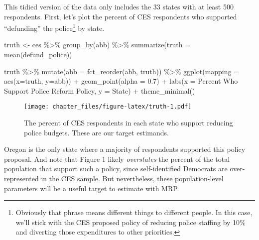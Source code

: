 \documentclass[
]{article}
\newenvironment{Shaded}{\begin{snugshade}}{\end{snugshade}}
\newcommand{\AttributeTok}[1]{\textcolor[rgb]{0.77,0.63,0.00}{#1}}
\newcommand{\FloatTok}[1]{\textcolor[rgb]{0.00,0.00,0.81}{#1}}
\newcommand{\FunctionTok}[1]{\textcolor[rgb]{0.00,0.00,0.00}{#1}}
\newcommand{\NormalTok}[1]{#1}
\newcommand{\OtherTok}[1]{\textcolor[rgb]{0.56,0.35,0.01}{#1}}
\newcommand{\SpecialCharTok}[1]{\textcolor[rgb]{0.00,0.00,0.00}{#1}}
\newcommand{\StringTok}[1]{\textcolor[rgb]{0.31,0.60,0.02}{#1}}
\begin{document}
This tidied version of the data only includes the 33 states with at
least 500 respondents. First, let's plot the percent of CES respondents
who supported ``defunding'' the police\footnote{Obviously that phrase
  means different things to different people. In this case, we'll stick
  with the CES proposed policy of reducing police staffing by 10\% and
  diverting those expenditures to other priorities.} by state.

\begin{Shaded}
\begin{Highlighting}[]
\NormalTok{truth }\OtherTok{\textless{}{-}}\NormalTok{ ces }\SpecialCharTok{\%\textgreater{}\%} 
  \FunctionTok{group\_by}\NormalTok{(abb) }\SpecialCharTok{\%\textgreater{}\%} 
  \FunctionTok{summarize}\NormalTok{(}\AttributeTok{truth =} \FunctionTok{mean}\NormalTok{(defund\_police))}

\NormalTok{truth }\SpecialCharTok{\%\textgreater{}\%} 
  \FunctionTok{mutate}\NormalTok{(}\AttributeTok{abb =} \FunctionTok{fct\_reorder}\NormalTok{(abb, truth)) }\SpecialCharTok{\%\textgreater{}\%} 
  \FunctionTok{ggplot}\NormalTok{(}\AttributeTok{mapping =} \FunctionTok{aes}\NormalTok{(}\AttributeTok{x=}\NormalTok{truth, }\AttributeTok{y=}\NormalTok{abb)) }\SpecialCharTok{+}
  \FunctionTok{geom\_point}\NormalTok{(}\AttributeTok{alpha =} \FloatTok{0.7}\NormalTok{) }\SpecialCharTok{+}
  \FunctionTok{labs}\NormalTok{(}\AttributeTok{x =} \StringTok{\textquotesingle{}Percent Who Support Police Reform Policy\textquotesingle{}}\NormalTok{,}
       \AttributeTok{y =} \StringTok{\textquotesingle{}State\textquotesingle{}}\NormalTok{) }\SpecialCharTok{+}
  \FunctionTok{theme\_minimal}\NormalTok{()}
\end{Highlighting}
\end{Shaded}

\begin{figure}
\centering
\texttt{[image: chapter\_files/figure-latex/truth-1.pdf]}
\caption{The percent of CES respondents in each state who support
reducing police budgets. These are our target estimands.}
\end{figure}

Oregon is the only state where a majority of respondents supported this
policy proposal. And note that Figure 1 likely \emph{overstates} the
percent of the total population that support such a policy, since
self-identified Democrats are over-represented in the CES sample. But
nevertheless, these population-level parameters will be a useful target
to estimate with MRP.
\end{document}
